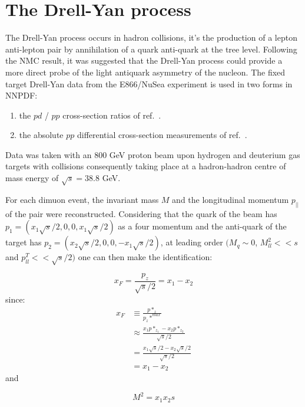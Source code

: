 \documentclass[11pt]{article}
\newcommand{\be}{\begin{equation}}
\newcommand{\ee}{\end{equation}}
\begin{document}
\section{The Drell-Yan process}
The Drell-Yan process occurs in hadron collisions, it's the production of a lepton anti-lepton pair by annihilation of a quark anti-quark at the tree level.
Following the NMC result, it was suggested that the Drell-Yan process could provide a more direct probe of the light antiquark asymmetry of the nucleon.
The fixed target Drell-Yan data from the E866/NuSea experiment is used in two forms in NNPDF:
\begin{enumerate}
    \item the $pd$ / $pp$ cross-section ratios of ref.~\cite{Towell:2001nh}.
    \item the absolute $pp$ differential cross-section measurements of ref.~\cite{Webb:2003ps}.
\end{enumerate}

Data was taken with an 800 GeV proton beam upon hydrogen and deuterium gas targets with collisions consequently taking place at a hadron-hadron centre of mass energy of $\sqrt{s}=38.8$ GeV.

For each dimuon event, the invariant mass $M$ and the longitudinal momentum $p_{||}$ of the pair
were reconstructed. Considering that the quark of the beam has $p_1 = (x_1\sqrt{s}/2,0,0,x_1\sqrt{s}/2)$ as a four momentum and the anti-quark of the target has $p_2 = (x_2\sqrt{s}/2,0,0,-x_1\sqrt{s}/2)$, at leading order $(M_q \sim 0$, $M_{ll}^2 << s$ and $p_{ll}^T << \sqrt{s}/2)$ one can then make the identification:

\be \boxed{x_F = \frac{p_{z}}{\sqrt{s}/2} = x_1 - x_2} \ee
since:
\begin{align*}
x_F &\equiv \frac{p*_z}{p_z*^{max}} \\
&\approx \frac{x_1p*_z_1 - x_2p*_z_2}{\sqrt{s}/2} \\
&= \frac{x_1\sqrt{s}/2 - x_2\sqrt{s}/2}{\sqrt{s}/2}\\
&= x_1 - x_2
\end{align*}
and

\be \boxed{M^2 = x_1x_2s} \ee
\end{document}
